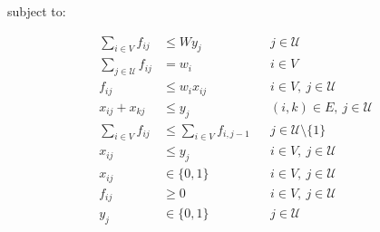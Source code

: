 \documentclass{article}
\begin{document}
subject to:

\begin{align}
\sum_{i \in V} f_{ij}
&\leq W y_j
&& j \in \mathcal{U}
\tag{3}\\[6pt]
\sum_{j \in \mathcal{U}} f_{ij}
&= w_i
&& i \in V
\tag{4}\\[6pt]
f_{ij}
&\leq w_i x_{ij}
&& i \in V,\ j \in \mathcal{U}
\tag{5}\\[6pt]
x_{ij} + x_{kj}
&\leq y_j
&& (i,k) \in E,\ j \in \mathcal{U}
\tag{6}\\[6pt]
\sum_{i \in V} f_{ij}
&\leq \sum_{i \in V} f_{i,j-1}
&& j \in \mathcal{U} \setminus \{1\}
\tag{7}\\[6pt]
x_{ij}
&\leq y_j
&& i \in V,\ j \in \mathcal{U}
\tag{8}\\[6pt]
x_{ij}
&\in \{0,1\}
&& i \in V,\ j \in \mathcal{U}
\tag{9}\\[6pt]
f_{ij}
&\geq 0
&& i \in V,\ j \in \mathcal{U}
\tag{10}\\[6pt]
y_j
&\in \{0,1\}
&& j \in \mathcal{U}
\tag{11}
\end{align}
\end{document}
